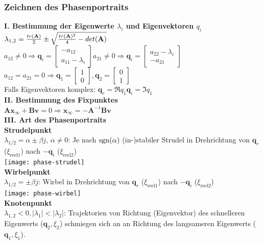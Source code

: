 \documentclass[fs, footer]{latex4ei}
\begin{document}
\begin{multicols*}{4}
    \subsubsection{Zeichnen des Phasenportraits}
    \textbf{I. Bestimmung der Eigenwerte $\lambda_i$ und Eigenvektoren $q_i$}\\
    $\lambda_{1,2} = \frac{tr(\textbf{A})}{2} \pm \sqrt{\frac{tr(\textbf{A})^2}{4}-det(\textbf{A})}$\\
$a_{12} \neq 0 \Rightarrow \mathbf{q}_i = \begin{bmatrix}-a_{12}\\a_{11}-\lambda_i\end{bmatrix}$\quad $a_{21} \neq 0 \Rightarrow \mathbf{q}_i = \begin{bmatrix}a_{22}-\lambda_i\\-a_{21}\end{bmatrix}$\quad$a_{12} = a_{21} = 0 \Rightarrow \mathbf{q}_1 = \begin{bmatrix}1\\0\end{bmatrix}, \mathbf{q}_2 = \begin{bmatrix}0\\1\end{bmatrix}$\\
Falls Eigenvektoren komplex: $\mathbf{q}_r = \Re{q_1}$\qquad$\mathbf{q}_i = \Im{q_1}$\\
\textbf{II. Bestimmung des Fixpunktes}\\
$\mathbf{A}\mathbf{x}_\infty + \mathbf{B}\mathbf{v} = 0 \Rightarrow \mathbf{x}_\infty = -\mathbf{A}^{-1} \mathbf{B}\mathbf{v}$\\
\textbf{III. Art des Phasenportraits}\\
\textbf{Strudelpunkt}\\
$\lambda_{1/2} = \alpha \pm \beta j$, $\alpha \neq 0$: Je nach $\operatorname{sgn}(\alpha)$ (in-)stabiler Strudel in Drehrichtung von $\mathbf{q}_r$ ($\xi_{\text{reel}1}$) nach $-\mathbf{q}_i$ ($\xi_{\text{reel}2}$)\\
\texttt{[image: phase-strudel]}\\
\textbf{Wirbelpunkt}\\
$\lambda_{1/2} = \pm \beta j$: Wirbel in Drehrichtung von $\mathbf{q}_r$ ($\xi_{\text{reel}1}$) nach $-\mathbf{q}_i$ ($\xi_{\text{reel}2}$)\\
\texttt{[image: phase-wirbel]}\\
\textbf{Knotenpunkt}\\
$\lambda_{1,2} < 0, |\lambda_1| < |\lambda_2|$: Trajektorien von Richtung (Eigenvektor) des schnelleren Eigenwerts ($\mathbf{q}_2, \xi_2$) schmiegen sich an an Richtung des langsameren Eigenwerts ($\mathbf{q}_1, \xi_1$).\\

\end{multicols*}
\end{document}
